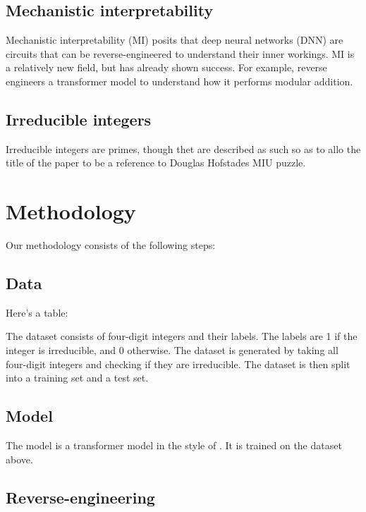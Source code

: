 \documentclass[11pt]{article} %
\begin{document}
\begin{multicols}{2}
  \subsection{Mechanistic
  interpretability}\label{mechanistic-interpretability}

  Mechanistic interpretability (MI) posits that deep neural networks
  (DNN) are circuits that can be reverse-engineered to understand their
  inner workings. MI is a relatively new field, but has already shown
  success. For example, \textcite{nanda2023} reverse engineers a
  transformer model \autocite{vaswani2017} to understand how it performs
  modular addition.

  \subsection{Irreducible integers}\label{irreducible-integers}

  Irreducible integers are primes, though thet are described as such so
  as to allo the title of the paper to be a reference to Douglas
  Hofstades MIU puzzle.

  \section{Methodology}\label{methodology}

  Our methodology consists of the following steps:

  \subsection{Data}\label{data}

  Here's a table:


  The dataset consists of four-digit integers and their labels. The
  labels are 1 if the integer is irreducible, and 0 otherwise. The
  dataset is generated by taking all four-digit integers and checking if
  they are irreducible. The dataset is then split into a training set
  and a test set.

  \subsection{Model}\label{model}

  The model is a transformer model in the style of \textcite{hu2023}. It
  is trained on the dataset above.

  \subsection{Reverse-engineering}\label{reverse-engineering}


\end{multicols}
\end{document}
